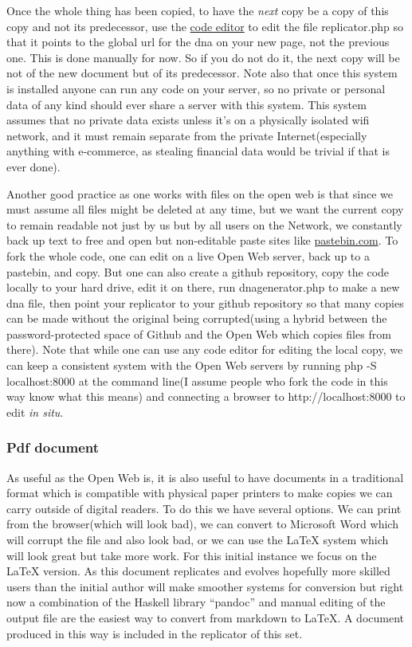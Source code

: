 Once the whole thing has been copied, to have the \emph{next} copy be a
copy of this copy and not its predecessor, use the
\href{editor.php}{code editor} to edit the file replicator.php so that
it points to the global url for the dna on your new page, not the
previous one. This is done manually for now. So if you do not do it, the
next copy will be not of the new document but of its predecessor. Note
also that once this system is installed anyone can run any code on your
server, so no private or personal data of any kind should ever share a
server with this system. This system assumes that no private data exists
unless it's on a physically isolated wifi network, and it must remain
separate from the private Internet(especially anything with e-commerce,
as stealing financial data would be trivial if that is ever done).

Another good practice as one works with files on the open web is that
since we must assume all files might be deleted at any time, but we want
the current copy to remain readable not just by us but by all users on
the Network, we constantly back up text to free and open but
non-editable paste sites like
\href{https://pastebin.com/}{pastebin.com}. To fork the whole code, one
can edit on a live Open Web server, back up to a pastebin, and copy. But
one can also create a github repository, copy the code locally to your
hard drive, edit it on there, run dnagenerator.php to make a new dna
file, then point your replicator to your github repository so that many
copies can be made without the original being corrupted(using a hybrid
between the password-protected space of Github and the Open Web which
copies files from there). Note that while one can use any code editor
for editing the local copy, we can keep a consistent system with the
Open Web servers by running php -S localhost:8000 at the command line(I
assume people who fork the code in this way know what this means) and
connecting a browser to http://localhost:8000 to edit \emph{in situ}.

\subsubsection{Pdf document}\label{pdf-document}

As useful as the Open Web is, it is also useful to have documents in a
traditional format which is compatible with physical paper printers to
make copies we can carry outside of digital readers. To do this we have
several options. We can print from the browser(which will look bad), we
can convert to Microsoft Word which will corrupt the file and also look
bad, or we can use the LaTeX system which will look great but take more
work. For this initial instance we focus on the LaTeX version. As this
document replicates and evolves hopefully more skilled users than the
initial author will make smoother systems for conversion but right now a
combination of the Haskell library ``pandoc'' and manual editing of the
output file are the easiest way to convert from markdown to LaTeX. A
document produced in this way is included in the replicator of this set.

